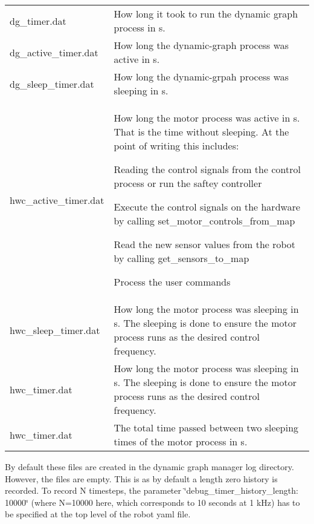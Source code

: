 \hypertarget{subsubpage_stl_simplify_cad}{}
\tabulinesep=1mm
\begin{longtabu} spread 0pt [c]{*2{|X[-1]}|}
\caption{}\label{subsubpage_stl_simplify_cad}\\
\hline
dg\+\_\+timer.\+dat &How long it took to run the dynamic graph process in s. \\
dg\+\_\+active\+\_\+timer.\+dat &How long the dynamic-\/graph process was active in s. \\
dg\+\_\+sleep\+\_\+timer.\+dat &How long the dynamic-\/grpah process was sleeping in s. \\
hwc\+\_\+active\+\_\+timer.\+dat &How long the motor process was active in s. That is the time without sleeping. At the point of writing this includes\+:
\begin{DoxyItemize}
\item Reading the control signals from the control process or run the saftey controller
\item Execute the control signals on the hardware by calling set\+\_\+motor\+\_\+controls\+\_\+from\+\_\+map
\item Read the new sensor values from the robot by calling get\+\_\+sensors\+\_\+to\+\_\+map
\item Process the user commands 
\end{DoxyItemize}\\
hwc\+\_\+sleep\+\_\+timer.\+dat &How long the motor process was sleeping in s. The sleeping is done to ensure the motor process runs as the desired control frequency. \\
hwc\+\_\+timer.\+dat &How long the motor process was sleeping in s. The sleeping is done to ensure the motor process runs as the desired control frequency. \\
hwc\+\_\+timer.\+dat &The total time passed between two sleeping times of the motor process in s. \\
\end{longtabu}


By default these files are created in the dynamic graph manager log directory. However, the files are empty. This is as by default a length zero history is recorded. To record N timesteps, the parameter \char`\"{}debug\+\_\+timer\+\_\+history\+\_\+length\+: 10000\char`\"{} (where N=10000 here, which corresponds to 10 seconds at 1 k\+Hz) has to be specified at the top level of the robot yaml file. 